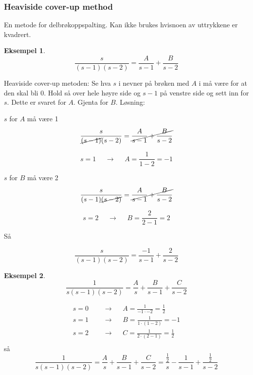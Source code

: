 \documentclass[11pt]{article}
\theoremstyle{definition}
\theoremstyle{definition}
\newtheorem{mitteks}{Eksempel}[section]
\theoremstyle{definition}
\theoremstyle{definition}
\theoremstyle{definition}
\theoremstyle{definition}
\begin{document}
	 \subsubsection{Heaviside cover-up method}
	 En metode for delbrøkoppspalting. Kan ikke brukes hvisnoen av uttrykkene er kvadrert.
	 
	 \begin{mitteks}
	 	\[\frac{s}{(s-1)(s-2)}=\frac{A}{s-1}+\frac{B}{s-2}\]

	 
	 Heaviside cover-up metoden: Se hva \(s\) i nevner på brøken med \(A\) i må være for at den skal bli \(0\). Hold så over hele høyre side og \(s-1\) på venstre side og sett inn for \(s\). Dette er svaret for \(A\). Gjenta for \(B\). Løsning:
	 
	 \(s\) for \(A\) må være 1
	 
	 \[\frac{s}{\cancel{(s-1)}(s-2)}=\cancel{\frac{A}{s-1}+\frac{B}{s-2}}\]
	 
	 \[s=1 \hspace{16pt} \rightarrow \hspace{16pt} A=\frac{1}{1-2}=-1 \]
	 
	 \(s\) for \(B\) må være 2
	 
	 \[\frac{s}{(s-1)\cancel{(s-2)}}=\cancel{\frac{A}{s-1}+\frac{B}{s-2}}\]
	 
	 \[s=2 \hspace{16pt} \rightarrow \hspace{16pt} B=\frac{2}{2-1}=2 \]
	 
	 Så
	 
	 \[\frac{s}{(s-1)(s-2)}=\frac{-1}{s-1}+\frac{2}{s-2}\]
	 
	 \end{mitteks}
	 
	 \begin{mitteks}
	 	
	 	\[\frac{1}{s(s-1)(s-2)}=\frac{A}{s}+\frac{B}{s-1}+\frac{C}{s-2}\]
	 	
	 	\begin{align*}
	 	s=0 \hspace{16pt}&\rightarrow \hspace{16pt} 
	 	A=\frac{1}{-1\cdot -2}=\frac{1}{2}
	 	\\
	 	s=1 \hspace{16pt}&\rightarrow \hspace{16pt}
	 	B=\frac{1}{1\cdot(1-2)}=-1
	 	\\
	 	s=2 \hspace{16pt}&\rightarrow \hspace{16pt}
	 	C=\frac{1}{2\cdot (2-1)}=\frac{1}{2}
	 	\\
	 	\end{align*}
	 	så
	 	\[\frac{1}{s(s-1)(s-2)}=\frac{A}{s}+\frac{B}{s-1}+\frac{C}{s-2}=\dfrac{\frac{1}{2}}{s}-\frac{1}{s-1}+\dfrac{\frac{1}{2}}{s-2}\]
	 \end{mitteks}
	 
\end{document}
